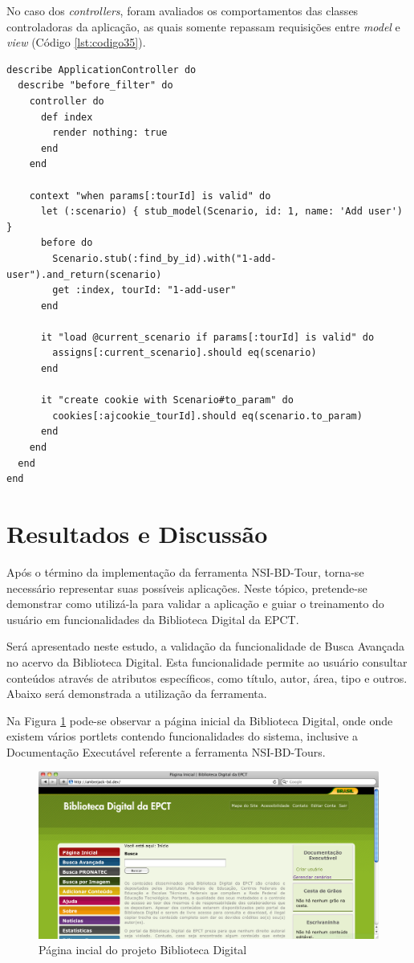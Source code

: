 No caso dos \textit{controllers}, foram avaliados os comportamentos das classes controladoras da aplicação, as quais somente repassam requisições entre \textit{model} e \textit{view} (Código \ref{lst:codigo35}).

{\singlespace
\begin{lstlisting}[caption=Teste unitário de \textit{controller},label={lst:codigo35}]
describe ApplicationController do
  describe "before_filter" do
    controller do
      def index
        render nothing: true
      end
    end

    context "when params[:tourId] is valid" do
      let (:scenario) { stub_model(Scenario, id: 1, name: 'Add user') }
      before do
        Scenario.stub(:find_by_id).with("1-add-user").and_return(scenario)
        get :index, tourId: "1-add-user"
      end

      it "load @current_scenario if params[:tourId] is valid" do
        assigns[:current_scenario].should eq(scenario)
      end

      it "create cookie with Scenario#to_param" do
        cookies[:ajcookie_tourId].should eq(scenario.to_param)
      end
    end
  end
end
\end{lstlisting}
}

\section{Resultados e Discussão}

Após o término da implementação da ferramenta NSI-BD-Tour, torna-se necessário representar suas possíveis aplicações. Neste tópico, pretende-se demonstrar como utilizá-la para validar a aplicação e guiar o treinamento do usuário em funcionalidades da Biblioteca Digital da EPCT.

Será apresentado neste estudo, a validação da funcionalidade de Busca Avançada no acervo da Biblioteca Digital. Esta funcionalidade permite ao usuário consultar conteúdos através de atributos específicos, como título, autor, área, tipo e outros. Abaixo será demonstrada a utilização da ferramenta.

Na Figura \ref{tour_1} pode-se observar a página inicial da Biblioteca Digital, onde onde existem vários portlets contendo funcionalidades do sistema, inclusive a Documentação Executável referente a ferramenta NSI-BD-Tours.

\begin{figure}[ht]
    \centering
    \includegraphics[width=0.9 \textwidth]{figuras/tour_1}
    \caption{Página incial do projeto Biblioteca Digital}
    \label{tour_1}
\end{figure}

